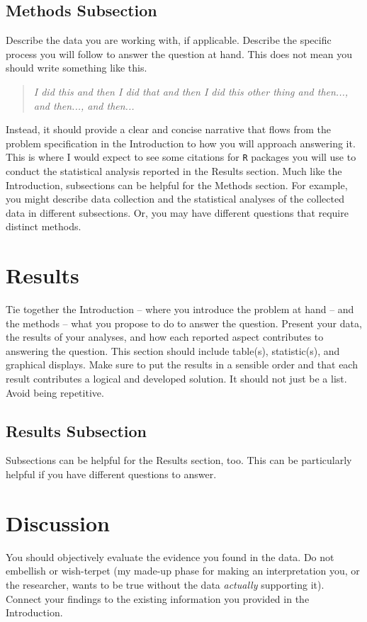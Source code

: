 \documentclass{article}\usepackage[]{graphicx}\usepackage[]{xcolor}
\begin{document}
\begin{multicols}{2}
\subsection{Methods Subsection}
Describe the data you are working with, if applicable. Describe the specific process you will follow to answer the question at hand. This does not mean you should write something like this.
\begin{quote}
\textit{I did this and then I did that and then I did this other thing and then..., and then..., and then...}
\end{quote}
Instead, it should provide a clear and concise narrative that flows from the problem specification in the Introduction to how you will approach answering it. This is where I would expect to see some citations for \texttt{R} packages you will use to conduct the statistical analysis reported in the Results section.
Much like the Introduction, subsections can be helpful for the Methods section. For example, you might describe data collection and the statistical analyses of the collected data in different subsections. Or, you may have different questions that require distinct methods. 

\section{Results}
Tie together the Introduction -- where you introduce the problem at hand -- and the methods --  what you propose to do to answer the question. Present your data, the results of your analyses, and how each reported aspect contributes to answering the question. This section should include table(s), statistic(s), and graphical displays. Make sure to put the results in a sensible order and that each result contributes a logical and developed solution. It should not just be a list. Avoid being repetitive. 

\subsection{Results Subsection}
Subsections can be helpful for the Results section, too. This can be particularly helpful if you have different questions to answer. 


\section{Discussion}
 You should objectively evaluate the evidence you found in the data. Do not embellish or wish-terpet (my made-up phase for making an interpretation you, or the researcher, wants to be true without the data \emph{actually} supporting it). Connect your findings to the existing information you provided in the Introduction.


\end{multicols}
\end{document}
